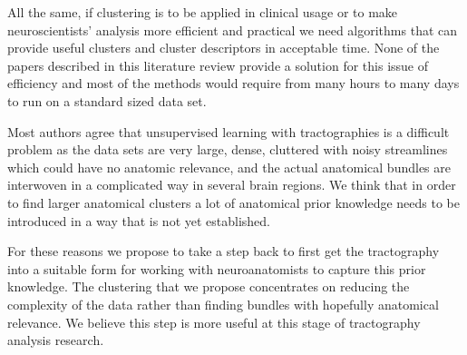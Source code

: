 \documentclass{bioinfo}
\begin{document}
All the same, if clustering is to be applied in clinical usage or to
make neuroscientists' analysis more efficient and practical we need
algorithms that can provide useful clusters and cluster descriptors in
acceptable time. None of the papers described in this literature review
provide a solution for this issue of efficiency and most of the methods
would require from many hours to many days to run on a standard sized
data set.


Most authors agree that unsupervised learning with tractographies is a
difficult problem as the data sets are very large, dense, cluttered with
noisy streamlines which could have no anatomic relevance, and the actual
anatomical bundles are interwoven in a complicated way in several brain regions.
We think that in order to find larger anatomical clusters a lot of
anatomical prior knowledge needs to be introduced in a way that is not
yet established.  

For these reasons we propose to take a step back to first get the
tractography into a suitable form for working with neuroanatomists to
capture this prior knowledge. The clustering that we propose
concentrates on reducing the complexity of the data rather than finding
bundles with hopefully anatomical relevance. We believe this step is
more useful at this stage of tractography analysis research.
\end{document}
